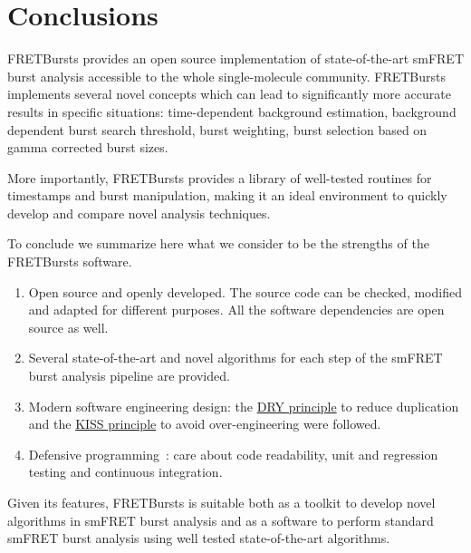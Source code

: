 \section{Conclusions}
\label{sec:conclusions}

FRETBursts provides an open source implementation of state-of-the-art smFRET burst analysis 
accessible to the whole single-molecule community.
FRETBursts implements several novel concepts which can lead 
to significantly more accurate results in specific situations:
time-dependent background estimation, background dependent burst search threshold,
burst weighting, burst selection based on gamma corrected burst sizes.

More importantly, FRETBursts provides a library of well-tested routines
for timestamps and burst manipulation, making it an ideal environment to 
quickly develop and compare novel analysis techniques.

To conclude we summarize here what we consider to be the strengths
of the FRETBursts software.

\begin{enumerate}
\item Open source and openly developed. The source code can be checked, modified and
adapted for different purposes. All the software dependencies are open source as well.
\item Several state-of-the-art and novel algorithms for each step of the
smFRET burst analysis pipeline are provided.
\item Modern software engineering design: the
\href{http://en.wikipedia.org/wiki/Don\%27t_repeat_yourself}{DRY principle}
to reduce duplication and the
\href{http://en.wikipedia.org/wiki/KISS_principle}{KISS principle}
to avoid over-engineering were followed.
\item Defensive programming~\cite{Prli__2012}: care about code readability,
unit and regression testing and continuous integration.
\end{enumerate}

Given its features, FRETBursts is suitable both as a toolkit to develop novel algorithms
in smFRET burst analysis and as a software to perform standard smFRET burst analysis
using well tested state-of-the-art algorithms.

